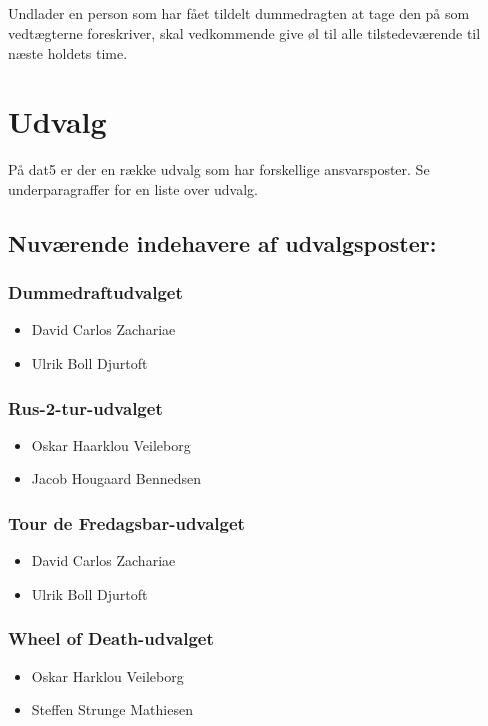 \documentclass{article}
\begin{document}
\subsection{}
Undlader en person som har fået tildelt dummedragten at tage den på som vedtægterne foreskriver, skal vedkommende give øl til alle tilstedeværende til næste holdets time.

\section{Udvalg}
På dat5 er der en række udvalg som har forskellige ansvarsposter. Se underparagraffer for en liste over udvalg.
\subsection{Nuværende indehavere af udvalgsposter:}
\subsubsection{Dummedraftudvalget}
\begin{itemize}
    \item David Carlos Zachariae
    \item Ulrik Boll Djurtoft
\end{itemize}
\subsubsection{Rus-2-tur-udvalget}
\begin{itemize}
    \item Oskar Haarklou Veileborg
    \item Jacob Hougaard Bennedsen
\end{itemize}
\subsubsection{Tour de Fredagsbar-udvalget}
\begin{itemize}
    \item David Carlos Zachariae
    \item Ulrik Boll Djurtoft
\end{itemize}
\subsubsection{Wheel of Death-udvalget}
\begin{itemize}
    \item Oskar Harklou Veileborg
    \item Steffen Strunge Mathiesen
\end{itemize}
\end{document}
